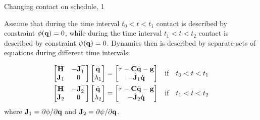 \documentclass{beamer}
\begin{document}
\begin{frame}{Changing contact on schedule, 1}
	\begin{flushleft}
		
		Assume that during the time interval $t_0 < t < t_1$ contact is described by constraint $\phi(\mathbf{q}) = 0$, while during the time interval $t_1 < t < t_2$ contact is described by constraint $\psi(\mathbf{q}) = 0$. Dynamics then is described by separate sets of equations during different time intervals:
		
		\begin{align}
			\begin{bmatrix}
				\mathbf{H} & -\mathbf{J}_1^\top \\
				\mathbf{J}_1 & 0
			\end{bmatrix}
			\begin{bmatrix}
				\ddot{\mathbf{q}} \\
				\lambda_1
			\end{bmatrix}
			=
			\begin{bmatrix}
				\tau - \mathbf{C} \dot{\mathbf{q}} - \mathbf{g} \\
				-\dot{\mathbf{J}}_1 \dot{\mathbf{q}}
			\end{bmatrix} & \ \ \  \text{if} \ \ \  t_0 < t < t_1
			\\
			\begin{bmatrix}
				\mathbf{H} & -\mathbf{J}_2^\top \\
				\mathbf{J}_2 & 0
			\end{bmatrix}
			\begin{bmatrix}
				\ddot{\mathbf{q}} \\
				\lambda_2
			\end{bmatrix}
			=
			\begin{bmatrix}
				\tau - \mathbf{C} \dot{\mathbf{q}} - \mathbf{g} \\
				-\dot{\mathbf{J}}_2 \dot{\mathbf{q}}
			\end{bmatrix} &\ \ \  \text{if} \ \ \  t_1 < t < t_2
		\end{align}
		where $\mathbf{J}_1 = \partial \phi / \partial \mathbf{q}$ and $\mathbf{J}_2 = \partial \psi / \partial \mathbf{q}$.
		
	\end{flushleft}
\end{frame}
\end{document}
